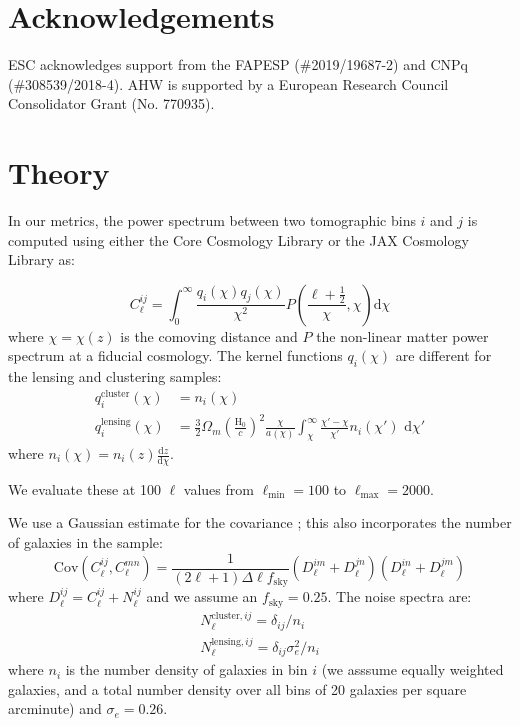 \documentclass[twocolumn,twocolappendix]{aastex63}
\begin{document}
\section{Acknowledgements}
ESC acknowledges support from the FAPESP (\#2019/19687-2) and CNPq  (\#308539/2018-4).
AHW is supported by a European Research Council Consolidator Grant (No. 770935).




\appendix

\section{Theory}\label{app:theory}

In our metrics, the power spectrum between two tomographic bins $i$ and $j$ is
computed using either the Core Cosmology Library \citep{ccl} or the JAX
Cosmology Library \citep{jax-cosmo} as:

\begin{equation}
    C^{ij}_\ell = \int_0^{\infty} \frac{q_i(\chi) q_j(\chi)}{\chi^2} P\left(\frac{\ell +\frac{1}{2}}{\chi}, \chi \right) \mathrm{d}\chi
\end{equation}
where $\chi = \chi(z)$ is the comoving distance and $P$ the non-linear matter power spectrum at
a fiducial cosmology.  The kernel functions $q_i(\chi)$ are different for the lensing and clustering samples:
\begin{align}
    q^{\mathrm{cluster}}_i(\chi) &= n_i(\chi)\\
    q^{\mathrm{lensing}}_i(\chi) &= \frac{3}{2}\Omega_m \left(\frac{\mathrm{H}_0}{c}\right)^2 \frac{\chi}{a(\chi)} \int_\chi^{\infty} \frac{\chi' - \chi}{\chi'} n_i(\chi')\,\,\mathrm{d}\chi'
\end{align}
where $n_i(\chi) = n_i(z) \frac{\mathrm{d}z}{\mathrm{d}\chi}$.

We evaluate these at 100 $\ell$ values from $\ell_\mathrm{min}=100$ to $\ell_\mathrm{max}=2000$.

We use a Gaussian estimate for the covariance \citep{takada_jain}; this also incorporates the number of galaxies in the
sample:
\begin{equation}
    \mathrm{Cov}(C^{ij}_\ell, C^{mn}_\ell) = \frac{1}{(2 \ell + 1)\Delta\ell f_\mathrm{sky}}(D^{im}_\ell + D^{jn}_\ell)(D^{in}_\ell + D^{jm}_\ell)
\end{equation}
where $D^{ij}_\ell = C^{ij}_\ell + N^{ij}_\ell$ and we assume an $f_\mathrm{sky}=0.25$.  The noise spectra are:
\begin{align}
N^{\mathrm{cluster},ij}_\ell = \delta_{ij} / n_i \\
N^{\mathrm{lensing},ij}_\ell = \delta_{ij} \sigma_e^2 / n_i
\end{align}
where $n_i$ is the number density of galaxies in bin $i$ (we asssume equally weighted galaxies, and a 
total number density over all bins of 20 galaxies per square arcminute) and $\sigma_e=0.26$.
\end{document}
